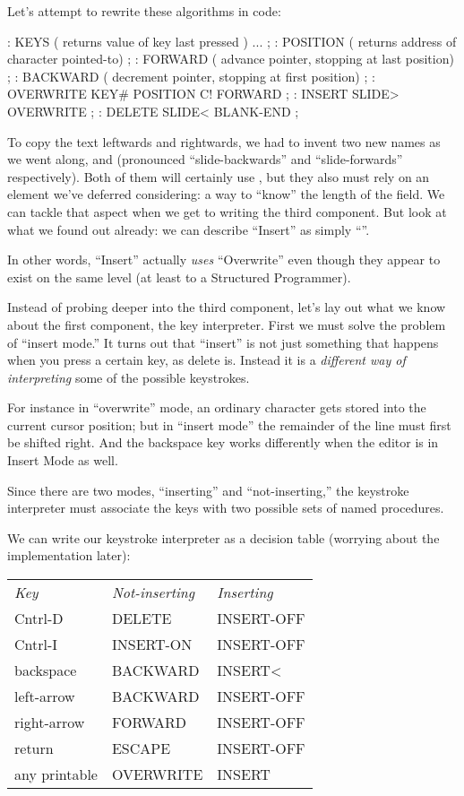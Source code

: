 Let's attempt to rewrite these algorithms in code:

\begin{Code}
: KEYS ( returns value of key last pressed ) ... ;
: POSITION ( returns address of character pointed-to) ;
: FORWARD ( advance pointer, stopping at last position) ;
: BACKWARD ( decrement pointer, stopping at first position) ;
: OVERWRITE KEY# POSITION C! FORWARD ;
: INSERT SLIDE> OVERWRITE ;
: DELETE SLIDE< BLANK-END ;
\end{Code}

To copy the text leftwards and rightwards, we had to invent two new
names as we went along,  and  (pronounced
``slide-backwards'' and ``slide-forwards'' respectively). Both of them
will certainly use , but they also must rely on an element
we've deferred considering: a way to ``know'' the length of the
field. We can tackle that aspect when we get to writing the third
component.  But look at what we found out already: we can describe
``Insert'' as simply ``''.

In other words, ``Insert'' actually \emph{uses} ``Overwrite'' even though
they appear to exist on the same level (at least to a Structured
Programmer).

Instead of probing deeper into the third component, let's lay out
what we know about the first component, the key interpreter. First we
must solve the problem of ``insert mode.'' It turns out that ``insert'' is
not just something that happens when you press a certain key, as
delete is. Instead it is a \emph{different way of interpreting}
some of the possible keystrokes.

For instance in ``overwrite'' mode, an ordinary character gets stored
into the current cursor position; but in ``insert mode'' the remainder
of the line must first be shifted right. And the backspace key works
differently when the editor is in Insert Mode as well.

Since there are two modes, ``inserting'' and ``not-inserting,'' the
keystroke interpreter must associate the keys with two possible sets of
named procedures.

We can write our keystroke interpreter as a decision table (worrying
about the implementation later):

\begin{tabular}{>{\ttfamily}l>{\ttfamily}l>{\ttfamily}l}
\emph{\textrm{Key}} &\emph{\textrm{Not-inserting}}& \emph{\textrm{Inserting}}\\
Cntrl-D        & DELETE              & INSERT-OFF\\
Cntrl-I        & INSERT-ON           & INSERT-OFF\\
backspace      & BACKWARD            & INSERT<	 \\
left-arrow     & BACKWARD            & INSERT-OFF\\
right-arrow    & FORWARD             & INSERT-OFF\\
return         & ESCAPE              & INSERT-OFF\\
any printable  & OVERWRITE           & INSERT    \\
\end{tabular}


